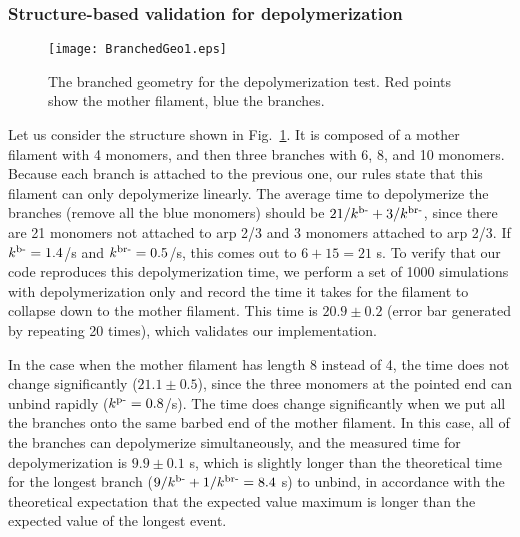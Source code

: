 \documentclass[11pt]{article}
\begin{document}
\begin{appendices}
\subsubsection{Structure-based validation for depolymerization}
\begin{figure}
\centering
\texttt{[image: BranchedGeo1.eps]}
\caption{\label{fig:BranchedGeo}The branched geometry for the depolymerization test. Red points show the mother filament, blue the branches.}
\end{figure}

Let us consider the structure shown in Fig.\ \ref{fig:BranchedGeo}. It is composed of a mother filament with 4 monomers, and then three branches with 6, 8, and 10 monomers. Because each branch is attached to the previous one, our rules state that this filament can only depolymerize linearly. The average time to depolymerize the branches (remove all the blue monomers) should be $21/k^\text{b-}+3/k^\text{br-}$, since there are 21 monomers not attached to arp 2/3 and 3 monomers attached to arp 2/3. If $k^\text{b-}=1.4$/s and $k^\text{br-}=0.5$/s, this comes out to $6+15=21$ s. To verify that our code reproduces this depolymerization time, we perform a set of 1000 simulations with depolymerization only and record the time it takes for the filament to collapse down to the mother filament. This time is $20.9 \pm 0.2$ (error bar generated by repeating 20 times), which validates our implementation. 

In the case when the mother filament has length 8 instead of 4, the time does not change significantly ($21.1 \pm 0.5$), since the three monomers at the pointed end can unbind rapidly ($k^\text{p-}=0.8$/s). The time does change significantly when we put all the branches onto the same barbed end of the mother filament. In this case, all of the branches can depolymerize simultaneously, and the measured time for depolymerization is $9.9 \pm 0.1$ s, which is slightly longer than the theoretical time for the longest branch ($9/k^\text{b-}+1/k^\text{br-}=8.4$ s) to unbind, in accordance with the theoretical expectation that the expected value maximum is longer than the expected value of the longest event.


\end{appendices}






\end{document}
